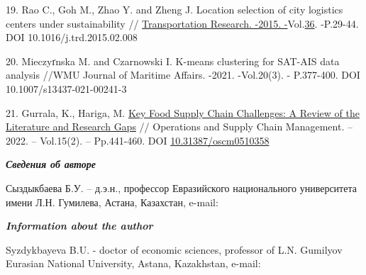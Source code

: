 \begin{references}
19. Rao C., Goh M., Zhao Y. and Zheng J. Location selection of city
logistics centers under sustainability //
\href{https://www.sciencedirect.com/journal/transportation-research-part-d-transport-and-environment}{Transportation
Research. -2015.
-}Vol.\href{file:///C:/Users/admin/Desktop/загрузки/36}{36}. -P.29-44.
DOI 10.1016/j.trd.2015.02.008

20. Mieczyґnska M. and Czarnowski I. K-means clustering for SAT-AIS data
analysis //WMU Journal of Maritime Affairs. -2021. -Vol.20(3). -
P.377-400. DOI 10.1007/s13437-021-00241-3

21. Gurrala, K., Hariga, M.
\href{https://journal.oscm-forum.org/publication/article/key-food-supply-chain-challenges-a-review-of-the-literature-and-research-gaps}{Key
Food Supply Chain Challenges: A Review of the Literature and Research
Gaps} // Operations and Supply Chain Management. -- 2022. -- Vol.15(2).
-- Pp.441-460. DOI
\href{http://doi.org/10.31387/oscm0510358}{10.31387/oscm0510358}
\end{references}

\begin{authorinfo}
\emph{{\bfseries Сведения об авторе}}

Сыздыкбаева Б.У. -- д.э.н., профессор Евразийского национального
университета имени Л.Н. Гумилева, Астана, Казахстан, e-mail:
\href{mailto:bakyt_syzdykbaeva@mail.ru}{}

\emph{{\bfseries Information about the author}}

Syzdykbayeva B.U. - doctor of economic sciences, professor of
L.N. Gumilyov Eurasian National University, Astana, Kazakhstan, e-mail:
\href{mailto:bakyt_syzdykbaeva@mail.ru}{}
\end{authorinfo}
